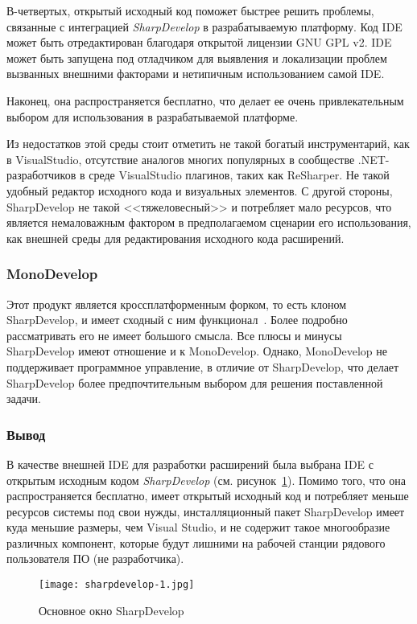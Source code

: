 В-четвертых, открытый исходный код поможет быстрее решить проблемы, связанные с интеграцией {\it SharpDevelop} в разрабатываемую платформу. Код IDE может быть отредактирован благодаря открытой лицензии GNU GPL v2. IDE может быть запущена под отладчиком для выявления и локализации проблем вызванных внешними факторами и нетипичным использованием самой IDE.

Наконец, она распространяется бесплатно, что делает ее очень привлекательным выбором для использования в разрабатываемой платформе.

Из недостатков этой среды стоит отметить не такой богатый инструментарий, как в VisualStudio, отсутствие аналогов многих популярных в сообществе .NET-разработчиков в среде  VisualStudio плагинов, таких как ReSharper. Не такой удобный редактор исходного кода и визуальных элементов. С другой стороны, SharpDevelop не такой <<тяжеловесный>> и потребляет мало ресурсов, что является немаловажным фактором в предполагаемом сценарии его использования, как внешней среды для редактирования исходного кода расширений.

\subsubsection{MonoDevelop}

Этот продукт является кроссплатформенным форком, то есть клоном SharpDevelop, и имеет сходный с ним функционал~\cite{monodevelop-website}. Более подробно рассматривать его не имеет большого смысла. Все плюсы и минусы SharpDevelop имеют отношение и к MonoDevelop. Однако, MonoDevelop не поддерживает программное управление, в отличие от SharpDevelop, что делает SharpDevelop более предпочтительным выбором для решения поставленной задачи.

\subsubsection{Вывод}

В качестве внешней IDE для разработки расширений была выбрана IDE с открытым исходным кодом {\it SharpDevelop} (см. рисунок~\ref{pic:sharpdevelop-main-wnd}). Помимо того, что она распространяется бесплатно, имеет открытый исходный код и потребляет меньше ресурсов системы под свои нужды, инсталляционный пакет SharpDevelop имеет куда меньшие размеры, чем Visual Studio, и не содержит такое многообразие различных компонент, которые будут лишними на рабочей станции рядового пользователя ПО (не разработчика).

\begin{figure}[!h]
    \centering
    \texttt{[image: sharpdevelop-1.jpg]}
    \caption{Основное окно SharpDevelop}
    \label{pic:sharpdevelop-main-wnd}
\end{figure} 

\pagebreak
